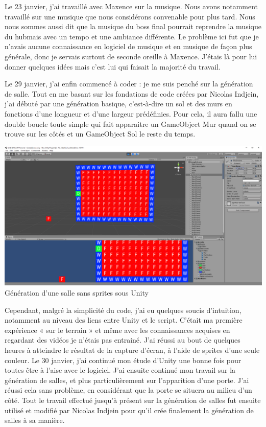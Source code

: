 \documentclass[]{extarticle}
\begin{document}
\begin{spacing}{1.25}
\bigbreak
\bigbreak 
Le 23 janvier, j’ai travaillé avec Maxence sur la musique. Nous avons notamment travaillé sur une musique que nous considérons convenable pour plus tard. Nous nous sommes aussi dit que la musique du boss final pourrait reprendre la musique du hubmais avec un tempo et une ambiance différente.
\bigbreak
Le problème ici fut que je n’avais aucune connaissance en logiciel de musique et en musique de façon plus générale, donc je servais surtout de seconde oreille à Maxence. J’étais là pour lui donner quelques idées mais c’est lui qui faisait la majorité du travail. 
\bigbreak

\bigbreak
\bigbreak
Le 29 janvier, j’ai enfin commencé à coder : je me suis penché sur la génération de salle. Tout en me basant sur les fondations de code créées par Nicolas Indjein, j’ai débuté par une génération basique, c’est-à-dire un sol et des murs en fonctions d’une longueur et d’une largeur prédéfinies. 
\bigbreak
Pour cela, il aura fallu une double boucle toute simple qui fait apparaitre un GameObject Mur quand on se trouve sur les côtés et un GameObject Sol le reste du temps. 
\bigbreak
\begin{center}
\includegraphics[scale = 0.23]{generation.PNG}
\bigbreak
Génération d'une salle sans sprites sous Unity
\end{center}
\bigbreak
\bigbreak
Cependant, malgré la simplicité du code, j’ai eu quelques soucis d’intuition, notamment au niveau des liens entre Unity et le script. C’était ma première expérience « sur le terrain » et même avec les connaissances acquises en regardant des vidéos je n’étais pas entrainé.
\bigbreak
J’ai réussi au bout de quelques heures à atteindre le résultat de la capture d'écran, à l’aide de sprites d’une seule couleur.
\bigbreak
Le 30 janvier, j’ai continué mon étude d’Unity une bonne fois pour toutes être à l’aise avec le logiciel.  
\bigbreak
J’ai ensuite continué mon travail sur la génération de salles, et plus particulièrement sur l’apparition d’une porte. J’ai réussi cela sans problème, en considérant que la porte se situera au milieu d’un côté. 
\bigbreak
Tout le travail effectué jusqu’à présent sur la génération de salles fut ensuite utilisé et modifié par Nicolas Indjein pour qu’il crée finalement la génération de salles à sa manière.
\bigbreak


\end{spacing}
\end{document}
